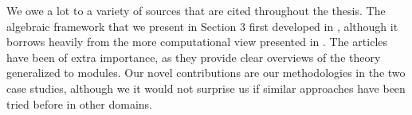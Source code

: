 We owe a lot to a variety of sources that are cited throughout the thesis. The algebraic framework that we present in Section 3 first developed in \cite{Zomorodian2005}, although it borrows heavily from the more computational view presented in \cite{edelszom}. The articles \cite{vejdemo,skraba} have been of extra importance, as they provide clear overviews of the theory generalized to modules. Our novel contributions are our methodologies in the two case studies, although we it would not surprise us if similar approaches have been tried before in other domains.


